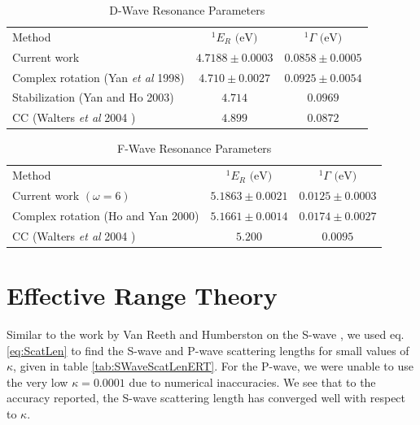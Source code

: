 \documentclass[preprint,showpacs,preprintnumbers,amsmath,amssymb]{revtex4}
\begin{document}
\begin{table}[H]
\begin{center}
\begin{ruledtabular}
\begin{tabular}{l c c}
Method & $^1E_R \text{ (eV)}$ & $^1\Gamma \text{ (eV)}$ \\
\colrule
Current work & $4.7188 \pm 0.0003$ & $0.0858 \pm 0.0005$ \\
Complex rotation (Yan \emph{et al} 1998) \cite{Ho1998} & $4.710 \pm 0.0027$ & $0.0925 \pm 0.0054$  \\
Stabilization (Yan and Ho 2003) \cite{Yan2003} & $4.714$ & $0.0969$ \\
CC (Walters \emph{et al} 2004 \cite{Walters2004}) & $4.899$ & $0.0872$ \\
\end{tabular}
\end{ruledtabular}
\caption{D-Wave Resonance Parameters} %
\label{tab:DWaveResonances}
\end{center}
\end{table}


\begin{table}[H]
\begin{center}
\begin{ruledtabular}
\begin{tabular}{l c c}
Method & $^1E_R \text{ (eV)}$ & $^1\Gamma \text{ (eV)}$ \\
\colrule
Current work $(\omega = 6)$ & $5.1863 \pm 0.0021$ & $0.0125 \pm 0.0003$ \\
Complex rotation (Ho and Yan 2000) \cite{Ho2000} & $5.1661 \pm 0.0014$ & $0.0174 \pm 0.0027$  \\
CC (Walters \emph{et al} 2004 \cite{Walters2004}) & $5.200$ & $0.0095$ \\
\end{tabular}
\end{ruledtabular}
\caption{F-Wave Resonance Parameters} %
\label{tab:FWaveResonances}
\end{center}
\end{table}



\section{Effective Range Theory}

Similar to the work by Van Reeth and Humberston on the S-wave \cite{VanReeth2003}, we used eq. \ref{eq:ScatLen} to find the S-wave and P-wave scattering lengths for small values of $\kappa$, given in table \ref{tab:SWaveScatLenERT}. For the P-wave, we were unable to use the very low $\kappa = 0.0001$ due to numerical inaccuracies. We see that to the accuracy reported, the S-wave scattering length has converged well with respect to $\kappa$.
\end{document}
